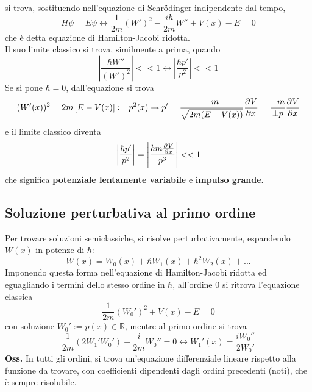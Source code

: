 si trova, sostituendo nell'equazione di Schrödinger indipendente dal tempo,
$$H\psi = E\psi\leftrightarrow\frac{1}{2m}(W')^2 -\frac{i\hbar}{2m}W''+V(x)-E=0$$
che è detta equazione di Hamilton-Jacobi ridotta.\\
Il suo limite classico si trova, similmente a prima, quando
$$\left|\frac{\hbar W''}{(W')^2}\right|<<1\leftrightarrow\left|\frac{\hbar p'}{p^2}\right|<<1$$
Se si pone $\hbar=0$, dall'equazione si trova
$$(W'(x))^2 = 2m\left[E-V(x)\right]:=p^2(x)\rightarrow p' = \frac{-m}{\sqrt{2m(E-V(x))}}\pdv[]{V}{x}=
\frac{-m}{\pm p}\pdv[]{V}{x}$$
e il limite classico diventa
$$\left|\frac{\hbar p'}{p^2}\right| = \left|\frac{\hbar m\pdv[]{V}{x}}{p^3}\right|<<1$$
che significa \textbf{potenziale lentamente variabile} e \textbf{impulso grande}.
\subsection{Soluzione perturbativa al primo ordine}
Per trovare soluzioni semiclassiche, si risolve perturbativamente, espandendo $W(x)$ in potenze di
$\hbar$:
$$W(x) = W_0(x) +\hbar W_1(x)+\hbar^2W_2(x)+...$$
Imponendo questa forma nell'equazione di Hamilton-Jacobi ridotta ed eguagliando i termini dello stesso
ordine in $\hbar$, all'ordine 0 si ritrova l'equazione classica
$$\frac{1}{2m}(W_0')^2 +V(x)-E=0$$
con soluzione $W_0' :=p(x)\in\mathbb{R}$, mentre al primo ordine si trova
$$\frac{1}{2m}\left(2W_1'W_0'\right)-\frac{i}{2m}W_0'' = 0 \leftrightarrow
W_1'(x) = \frac{iW_0''}{2W_0'}$$
\textbf{Oss.} In tutti gli ordini, si trova un'equazione differenziale lineare rispetto alla funzione
da trovare, con coefficienti dipendenti dagli ordini precedenti (noti), che è sempre risolubile.\\

